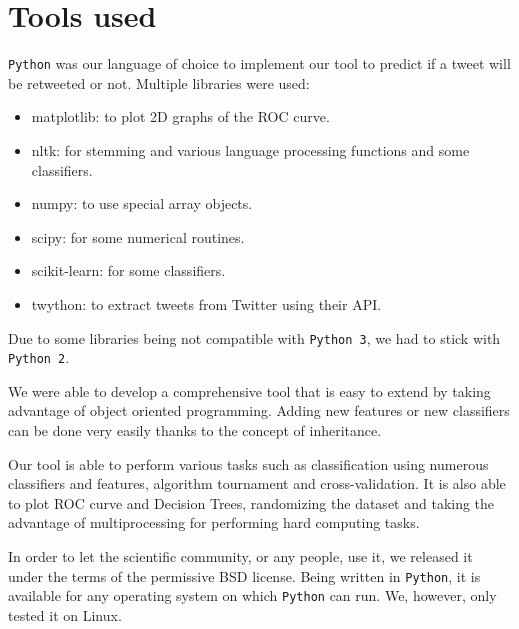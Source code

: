 \section{Tools used}

\verb|Python| was our language of choice to implement our tool to predict if a 
tweet will be retweeted or not. Multiple libraries were used:
\begin{itemize}
	\item matplotlib: to plot 2D graphs of the ROC curve.
	\item nltk: for stemming and various language processing functions and some 
		  classifiers.
	\item numpy: to use special array objects.
	\item scipy: for some numerical routines.
	\item scikit-learn: for some classifiers.
	\item twython: to extract tweets from Twitter using their API.
\end{itemize}

Due to some libraries being not compatible with \verb|Python 3|, we had to 
stick with \verb|Python 2|.

We were able to develop a comprehensive tool that is easy to extend by taking 
advantage of object oriented programming. Adding new features or new 
classifiers can be done very easily thanks to the concept of inheritance.

Our tool is able to perform various tasks such as classification using numerous 
classifiers and features, algorithm tournament and cross-validation. It is also 
able to plot ROC curve and Decision Trees, randomizing the dataset and taking 
the advantage of multiprocessing for performing hard computing tasks.

In order to let the scientific community, or any people, use it, we released it 
under the terms of the permissive BSD license. Being written in \verb|Python|, 
it is available for any operating system on which \verb|Python| can run. We, 
however, only tested it on Linux.
